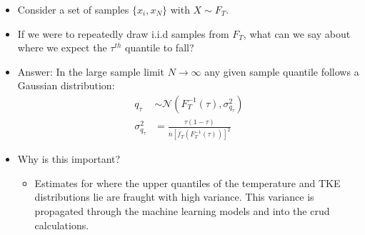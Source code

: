 \documentclass[t, pdftex]{beamer}
\begin{document}
\begin{frame}
\begin{itemize}
\item Consider a set of samples $\{x_i, x_N \}$ with $X \sim F_T$.
\item If we were to repeatedly draw i.i.d samples from $F_T$, what can we say about where we expect the $\tau^{th}$ quantile to fall?
\item Answer:  In the large sample limit $N \rightarrow \infty$ any given sample quantile follows a Gaussian distribution:
\begin{align}
q_\tau &\sim \mathcal N \left( F_T^{-1}(\tau), \sigma^2_{q_\tau} \right) \nonumber \\
\sigma^2_{q_\tau} &= \frac{\tau(1 - \tau)}{n[f_T(F_T^{-1}(\tau))]^2} \nonumber
\label{eq:theory_qdist_1}
\end{align}

\item Why is this important?
\begin{itemize}
\item Estimates for where the upper quantiles of the temperature and TKE distributions lie are fraught with high variance.  This variance is propagated through the machine learning models and into the crud calculations.
\end{itemize}
\end{itemize}
\end{frame}
\end{document}
